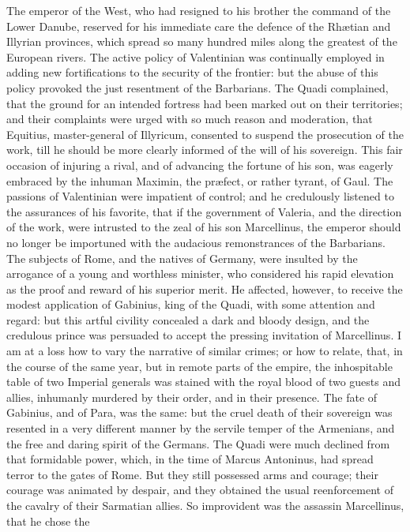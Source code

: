 {{{{{{{{{{{{{{{{{{{{{{{{{{{{{{{{{{{{{{{{{{{{{{{{{{{{{{{{{{{{{{{{{{{{{{{{{{{{{{{{{{{{{{{{{{{{{{{{{{{{{{{{{{{{{{{{{{{{{{{{{{{{{{{{{{{{{{{{{{{{{{{{{{{{{{{{{{{{{{{{{{{{{{{{The emperor of the West, who had resigned to his brother the
command of the Lower Danube, reserved for his immediate care the
defence of the Rhætian and Illyrian provinces, which spread so
many hundred miles along the greatest of the European rivers. The
active policy of Valentinian was continually employed in adding
new fortifications to the security of the frontier: but the abuse
of this policy provoked the just resentment of the Barbarians.
The Quadi complained, that the ground for an intended fortress
had been marked out on their territories; and their complaints
were urged with so much reason and moderation, that Equitius,
master-general of Illyricum, consented to suspend the prosecution
of the work, till he should be more clearly informed of the will
of his sovereign. This fair occasion of injuring a rival, and of
advancing the fortune of his son, was eagerly embraced by the
inhuman Maximin, the præfect, or rather tyrant, of Gaul. The
passions of Valentinian were impatient of control; and he
credulously listened to the assurances of his favorite, that if
the government of Valeria, and the direction of the work, were
intrusted to the zeal of his son Marcellinus, the emperor should
no longer be importuned with the audacious remonstrances of the
Barbarians. The subjects of Rome, and the natives of Germany,
were insulted by the arrogance of a young and worthless minister,
who considered his rapid elevation as the proof and reward of his
superior merit. He affected, however, to receive the modest
application of Gabinius, king of the Quadi, with some attention
and regard: but this artful civility concealed a dark and bloody
design, and the credulous prince was persuaded to accept the
pressing invitation of Marcellinus. I am at a loss how to vary
the narrative of similar crimes; or how to relate, that, in the
course of the same year, but in remote parts of the empire, the
inhospitable table of two Imperial generals was stained with the
royal blood of two guests and allies, inhumanly murdered by their
order, and in their presence. The fate of Gabinius, and of Para,
was the same: but the cruel death of their sovereign was resented
in a very different manner by the servile temper of the
Armenians, and the free and daring spirit of the Germans. The
Quadi were much declined from that formidable power, which, in
the time of Marcus Antoninus, had spread terror to the gates of
Rome. But they still possessed arms and courage; their courage
was animated by despair, and they obtained the usual
reenforcement of the cavalry of their Sarmatian allies. So
improvident was the assassin Marcellinus, that he chose the
}}}}}}}}}}}}}}}}}}}}}}}}}}}}}}}}}}}}}}}}}}}}}}}}}}}}}}}}}}}}}}}}}}}}}}}}}}}}}}}}}}}}}}}}}}}}}}}}}}}}}}}}}}}}}}}}}}}}}}}}}}}}}}}}}}}}}}}}}}}}}}}}}}}}}}}}}}}}}}}}}}}}}}}}
